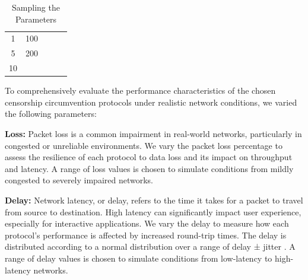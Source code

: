 \begin{table}[tbh]
\begin{tabular}{ccccc}
		\rowcolor[HTML]{EFEFEF}
		1                                                                & 100                                                               &                                                                    &                                                                       &                                                                             \\
		5                                                                & 200                                                               &                                                                    &                                                                       &                                                                             \\
		\rowcolor[HTML]{EFEFEF}
		10                                                               &                                                                   &                                                                    &                                                                       &                                                                             \\ \bottomrule
	\end{tabular}
	\caption{Sampling the Parameters}
	\label{tab:parameters}
\end{table}

To comprehensively evaluate the performance characteristics of the chosen censorship circumvention protocols under realistic network conditions, we varied the following parameters:

\noindent\textbf{Loss:} Packet loss is a common impairment in real-world networks, particularly in congested or unreliable environments.
We vary the packet loss percentage to assess the resilience of each protocol to data loss and its impact on throughput and latency.
A range of loss values is chosen to simulate conditions from mildly congested to severely impaired networks.

\noindent\textbf{Delay:} Network latency, or delay, refers to the time it takes for a packet to travel from source to destination.
High latency can significantly impact user experience, especially for interactive applications.
We vary the delay to measure how each protocol's performance is affected by increased round-trip times.
The delay is distributed according to a normal distribution over a range of delay ± jitter \cite{man8:tc-netem}.
A range of delay values is chosen to simulate conditions from low-latency to high-latency networks.

